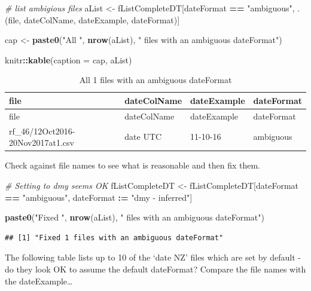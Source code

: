 \documentclass[]{article}
\newenvironment{Shaded}{\begin{snugshade}}{\end{snugshade}}
\newcommand{\KeywordTok}[1]{\textcolor[rgb]{0.13,0.29,0.53}{\textbf{#1}}}
\newcommand{\DataTypeTok}[1]{\textcolor[rgb]{0.13,0.29,0.53}{#1}}
\newcommand{\StringTok}[1]{\textcolor[rgb]{0.31,0.60,0.02}{#1}}
\newcommand{\CommentTok}[1]{\textcolor[rgb]{0.56,0.35,0.01}{\textit{#1}}}
\newcommand{\OperatorTok}[1]{\textcolor[rgb]{0.81,0.36,0.00}{\textbf{#1}}}
\newcommand{\ErrorTok}[1]{\textcolor[rgb]{0.64,0.00,0.00}{\textbf{#1}}}
\newcommand{\NormalTok}[1]{#1}
\begin{document}
\begin{Shaded}
\begin{Highlighting}[]
\CommentTok{# list ambigious files}
\NormalTok{aList <-}\StringTok{ }\NormalTok{fListCompleteDT[dateFormat }\OperatorTok{==}\StringTok{ "ambiguous"}\NormalTok{, }
\NormalTok{                         .(file, dateColName, dateExample, dateFormat)]}

\NormalTok{cap <-}\StringTok{ }\KeywordTok{paste0}\NormalTok{(}\StringTok{"All "}\NormalTok{, }\KeywordTok{nrow}\NormalTok{(aList), }
              \StringTok{" files with an ambiguous dateFormat"}\NormalTok{)}

\NormalTok{knitr}\OperatorTok{::}\KeywordTok{kable}\NormalTok{(}\DataTypeTok{caption =}\NormalTok{ cap, aList)}
\end{Highlighting}
\end{Shaded}

\begin{longtable}[]{@{}llll@{}}
\caption{All 1 files with an ambiguous dateFormat}\tabularnewline
\toprule
file & dateColName & dateExample & dateFormat\tabularnewline
\midrule
\endfirsthead
\toprule
file & dateColName & dateExample & dateFormat\tabularnewline
\midrule
\endhead
rf\_46/12Oct2016-20Nov2017at1.csv & date UTC & 11-10-16 &
ambiguous\tabularnewline
\bottomrule
\end{longtable}

Check against file names to see what is reasonable and then fix them.

\begin{Shaded}
\begin{Highlighting}[]
\CommentTok{# Setting to dmy seems OK}
\NormalTok{fListCompleteDT <-}\StringTok{ }\NormalTok{fListCompleteDT[dateFormat }\OperatorTok{==}\StringTok{ "ambiguous"}\NormalTok{, }
\NormalTok{                                   dateFormat }\OperatorTok{:}\ErrorTok{=}\StringTok{ "dmy - inferred"}\NormalTok{]}

\KeywordTok{paste0}\NormalTok{(}\StringTok{"Fixed "}\NormalTok{, }\KeywordTok{nrow}\NormalTok{(aList), }\StringTok{" files with an ambiguous dateFormat"}\NormalTok{)}
\end{Highlighting}
\end{Shaded}

\begin{verbatim}
## [1] "Fixed 1 files with an ambiguous dateFormat"
\end{verbatim}

The following table lists up to 10 of the `date NZ' files which are set
by default - do they look OK to assume the default dateFormat? Compare
the file names with the dateExample\ldots{}
\end{document}
